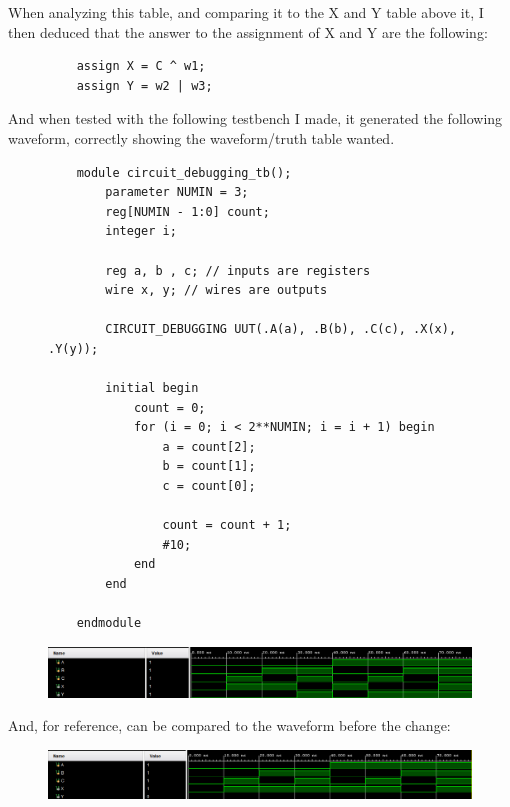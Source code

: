 When analyzing this table, and comparing it to the X and Y table above it, I then deduced that the answer to the assignment of X and Y are the following:
\begin{figure}[!htbp]
    \centering
    \begin{verbatim}
    assign X = C ^ w1;
    assign Y = w2 | w3;
    \end{verbatim}
\end{figure}\newline
And when tested with the following testbench I made, it generated the following waveform, correctly showing the waveform/truth table wanted.
\begin{figure}[!htbp]
    \centering
    \begin{verbatim}
    module circuit_debugging_tb();
        parameter NUMIN = 3;
        reg[NUMIN - 1:0] count;
        integer i;
        
        reg a, b , c; // inputs are registers
        wire x, y; // wires are outputs
        
        CIRCUIT_DEBUGGING UUT(.A(a), .B(b), .C(c), .X(x), .Y(y));
        
        initial begin
            count = 0;
            for (i = 0; i < 2**NUMIN; i = i + 1) begin
                a = count[2];
                b = count[1];
                c = count[0];
                
                count = count + 1;
                #10;
            end
        end
        
    endmodule
    \end{verbatim}
\end{figure}\newline
\begin{figure}[!htbp]
    \centering
    \caption{}
    \includegraphics[width=1\textwidth]{part-4-wave.png}
\end{figure}\newpage
And, for reference, can be compared to the waveform before the change:
\begin{figure}[!htbp]
    \centering
    \caption{}
    \includegraphics[width=1\textwidth]{part-4-wave-before.png}
\end{figure}\newline
